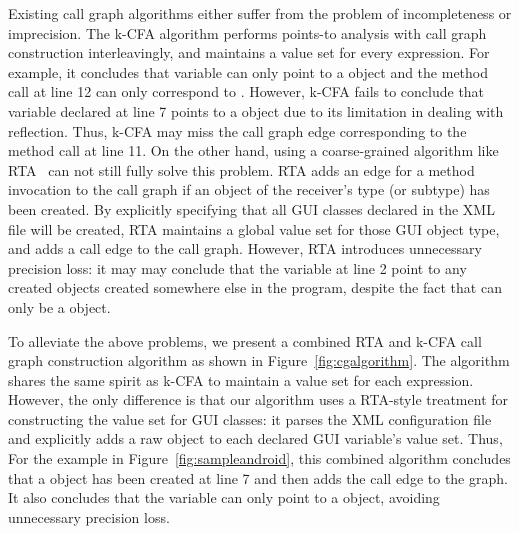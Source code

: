Existing call graph algorithms either suffer from the problem of incompleteness
or imprecision. The k-CFA algorithm performs points-to analysis with call
graph construction interleavingly, and maintains a value set for every expression.
For example, it concludes that variable  can only point
to a  object and the method call  at line 12
can only correspond to . However, k-CFA fails to
conclude that variable  declared at line 7 points to
a  object due to its limitation in dealing with reflection. Thus, k-CFA
may miss the call graph edge corresponding to the method call  at line 11. 
On the other hand, using a coarse-grained algorithm like RTA~\cite{} can not still
fully solve this problem. RTA adds an edge for a method invocation 
to the call graph if an object of the receiver's type (or subtype)
has been created.  By explicitly specifying that all GUI classes declared in the XML file will be created,
RTA maintains a global value set for those GUI object type, and  adds a
call edge  to the call graph. However, RTA introduces 
unnecessary precision loss: it may
may conclude that the  variable at line 2
point to any created  objects created somewhere else in the program, despite the
fact that  can only be a  object.


To alleviate the above problems, we present a combined RTA and k-CFA
call graph construction algorithm as shown in Figure~\ref{fig:cgalgorithm}.
The algorithm shares the same spirit as k-CFA to maintain a value set
for each expression. However, the only difference is that our
algorithm uses a RTA-style treatment for constructing the value set for
GUI classes: it parses the XML configuration file and explicitly
adds a raw object to each declared GUI variable's value set. Thus,
For the example in Figure~\ref{fig:sampleandroid}, this
combined algorithm concludes that a  object has been
created at line 7 and then adds the call edge  to the
graph. It also concludes that the  variable can only
point to a  object, avoiding unnecessary precision loss.

